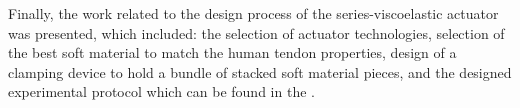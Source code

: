 Finally, the work related to the design process of the series-viscoelastic actuator was presented, which included: the selection of actuator technologies, selection of the best soft material to match the human tendon properties, design of a clamping device to hold a bundle of stacked soft material pieces, and the designed experimental protocol which can be found in the .